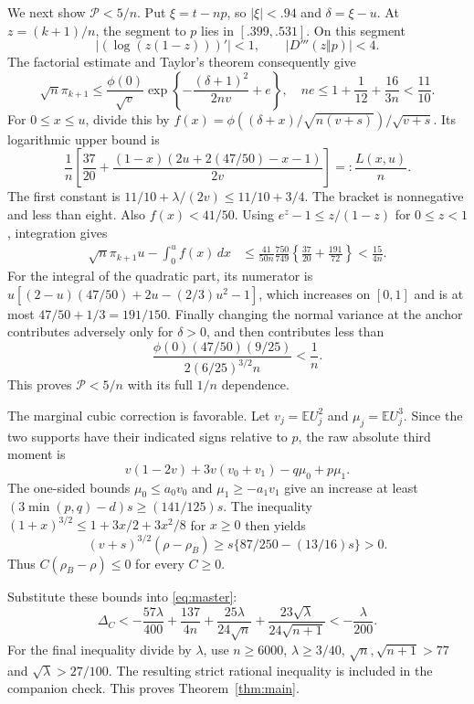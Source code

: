 \documentclass[11pt]{article}
\newcommand{\E}{\mathbb E}\newcommand{\Pp}{\mathbb P}
\begin{document}
We next show $\mathcal P<5/n$. Put $\xi=t-np$, so $|\xi|<.94$
and $\delta=\xi-u$. At $z=(k+1)/n$, the segment to $p$ lies in
$[.399,.531]$. On this segment
\[
 |(\log(z(1-z)))'|<1,\qquad |D'''(z\Vert p)|<4.
\]
The factorial estimate and Taylor's theorem consequently give
\begin{equation}\label{eq:massupper}
 \sqrt n\pi_{k+1}\le\frac{\phi(0)}{\sqrt v}
 \exp\left\{-\frac{(\delta+1)^2}{2nv}+e\right\},
 \quad ne\le1+\frac1{12}+\frac{16}{3n}<\frac{11}{10}.
\end{equation}
For $0\le x\le u$, divide this by
$f(x)=\phi((\delta+x)/\sqrt{n(v+s)})/\sqrt{v+s}$.
Its logarithmic upper bound is
\[
 \frac1n\left[\frac{37}{20}
       +\frac{(1-x)(2u+2(47/50)-x-1)}{2v}\right]=:\frac{L(x,u)}n.
\]
The first constant is $11/10+\lambda/(2v)\le11/10+3/4$.
The bracket is nonnegative and less than eight. Also $f(x)<41/50$.
Using $e^z-1\le z/(1-z)$ for $0\le z<1$, integration gives
\begin{align*}
 \sqrt n\pi_{k+1}u-\int_0^u f(x)\,dx
 &\le\frac{41}{50n}\frac{750}{749}
       \left\{\frac{37}{20}+\frac{191}{72}\right\}<\frac{15}{4n}.
\end{align*}
For the integral of the quadratic part, its numerator is
$u[(2-u)(47/50)+2u-(2/3)u^2-1]$, which increases on $[0,1]$
and is at most $47/50+1/3=191/150$.
Finally changing the normal variance at the anchor contributes adversely
only for $\delta>0$, and then contributes less than
\[
 \frac{\phi(0)(47/50)(9/25)}{2(6/25)^{3/2}n}<\frac1n.
\]
This proves $\mathcal P<5/n$ with its full $1/n$ dependence.

The marginal cubic correction is favorable. Let $v_j=\E U_j^2$ and
$\mu_j=\E U_j^3$. Since the two supports have their indicated signs
relative to $p$, the raw absolute third moment is
\[
 v(1-2v)+3v(v_0+v_1)-q\mu_0+p\mu_1.
\]
The one-sided bounds $\mu_0\le a_0v_0$ and
$\mu_1\ge-a_1v_1$ give an increase at least
$(3\min(p,q)-d)s\ge(141/125)s$.
The inequality $(1+x)^{3/2}\le1+3x/2+3x^2/8$ for $x\ge0$
then yields
\[
 (v+s)^{3/2}(\rho-\rho_B)
       \ge s\{87/250-(13/16)s\}>0.
\]
Thus $C(\rho_B-\rho)\le0$ for every $C\ge0$.

Substitute these bounds into \eqref{eq:master}:
\[
 \Delta_C< -\frac{57\lambda}{400}+\frac{137}{4n}
              +\frac{25\lambda}{24\sqrt n}
              +\frac{23\sqrt\lambda}{24\sqrt{n+1}}
           <-\frac\lambda{200}.
\]
For the final inequality divide by $\lambda$, use $n\ge6000$,
$\lambda\ge3/40$, $\sqrt n,\sqrt{n+1}>77$ and
$\sqrt\lambda>27/100$. The resulting strict rational inequality is
included in the companion check. This proves Theorem~\ref{thm:main}.
\end{document}
